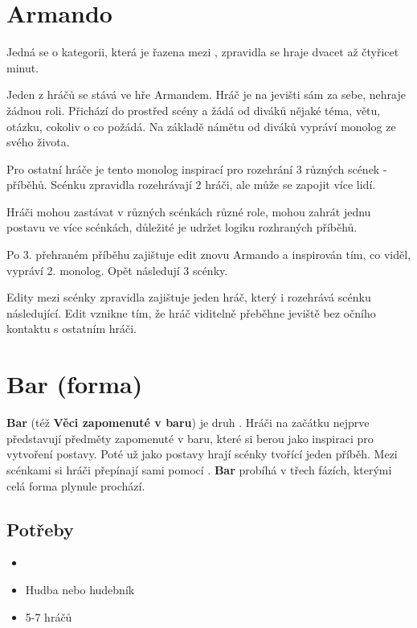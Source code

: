 \needspace{5cm} \section{Armando} \label{armando} Jedná se o kategorii, která je řazena mezi , zpravidla se hraje dvacet až čtyřicet minut. 
 
Jeden z hráčů se stává ve hře Armandem. Hráč je na jevišti sám za sebe, nehraje žádnou roli. Přichází do prostřed scény a žádá od diváků nějaké téma, větu, otázku, cokoliv o co požádá. 
Na základě námětu od diváků vypráví monolog ze svého života. 
 
Pro ostatní hráče je tento monolog inspirací pro rozehrání 3 různých scének - příběhů. Scénku zpravidla rozehrávají 2 hráči, ale může se zapojit více lidí. 
 
Hráči mohou zastávat v různých scénkách různé role, mohou zahrát jednu postavu ve více scénkách, důležité je udržet logiku rozhraných příběhů. 
 
Po 3. přehraném příběhu zajištuje edit znovu Armando a inspirován tím, co viděl, vypráví 2. monolog. Opět následují 3 scénky. 
 
Edity mezi scénky zpravidla zajištuje jeden hráč, který i rozehrává scénku následující. Edit vznikne tím, že hráč viditelně přeběhne jeviště bez očního kontaktu s ostatním hráči. 
 
 
\needspace{5cm} \section{Bar (forma)} \label{bar (forma)} \textbf{Bar}{}  (též \textbf{Věci zapomenuté v baru}{}) je druh . Hráči na začátku nejprve představují předměty zapomenuté v baru, které si berou jako inspiraci pro vytvoření postavy. Poté už jako postavy hrají scénky tvořící jeden příběh. Mezi scénkami si hráči přepínají sami pomocí . \textbf{Bar}{} probíhá v třech fázích, kterými celá forma plynule prochází. 
 
\subsection{ Potřeby } \begin{itemize}
\item  {}
\item  Hudba nebo hudebník
\item  5-7 hráčů
\end{itemize}
 
